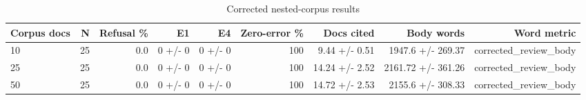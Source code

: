 \begin{table}[ht]
\centering
\caption{Corrected nested-corpus results}
\scriptsize
\begin{tabular}{lrrrrrrrr}
\toprule
Corpus docs & N & Refusal \% & E1 & E4 & Zero-error \% & Docs cited & Body words & Word metric \\
\midrule
10 & 25 & 0.0 & 0 +/- 0 & 0 +/- 0 & 100 & 9.44 +/- 0.51 & 1947.6 +/- 269.37 & corrected\_review\_body \\
25 & 25 & 0.0 & 0 +/- 0 & 0 +/- 0 & 100 & 14.24 +/- 2.52 & 2161.72 +/- 361.26 & corrected\_review\_body \\
50 & 25 & 0.0 & 0 +/- 0 & 0 +/- 0 & 100 & 14.72 +/- 2.53 & 2155.6 +/- 308.33 & corrected\_review\_body \\
\bottomrule
\end{tabular}
\end{table}

